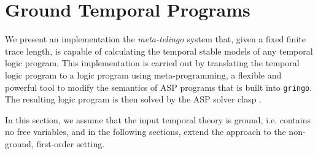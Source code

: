 \section{Ground Temporal Programs}\label{sec:ground}

We present an implementation the \emph{meta-telingo} system that,
given a fixed finite trace length, is capable of calculating the
temporal stable models of any temporal logic program. This
implementation is carried out by translating the temporal logic
program to a logic program using meta-programming, a flexible and
powerful tool to modify the semantics of ASP programs
\cite{karoscwa21a} \cite{gepuscto08a} \cite{eifalepf03a} that is built
into \verb|gringo|. The resulting logic program is then solved by the
ASP solver clasp \cite{gekanesc07b}.

In this section, we assume that the input temporal theory is ground,
i.e. contains no free variables, and in the following sections, extend
the approach to the non-ground, first-order setting.







